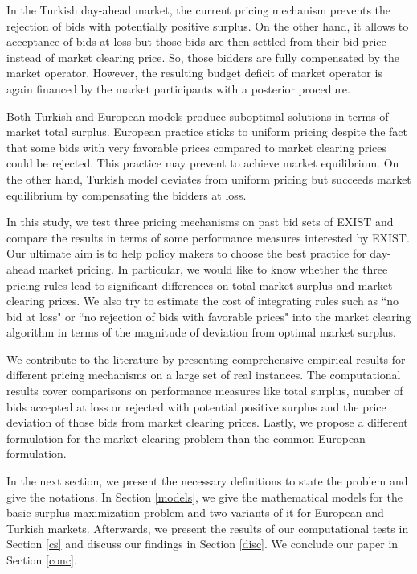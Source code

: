 \documentclass[conference]{IEEEtran}
\begin{document}
In the Turkish day-ahead market, the current pricing mechanism prevents the rejection of bids with potentially positive surplus. On the other hand, it allows to acceptance of bids at loss but those bids are then settled from their bid price instead of market clearing price. So, those bidders are fully compensated by the market operator. However, the resulting budget deficit of market operator is again financed by the market participants with a posterior procedure. 

Both Turkish and European models produce suboptimal solutions in terms of market total surplus. European practice sticks to uniform pricing despite the fact that some bids with very favorable prices compared to market clearing prices could be rejected. This practice may prevent to achieve market equilibrium. On the other hand, Turkish model deviates from uniform pricing but succeeds market equilibrium by compensating the bidders at loss.

In this study, we test three pricing mechanisms on past bid sets of EXIST and compare the results in terms of some performance measures interested by EXIST. Our ultimate aim is to help policy makers to choose the best practice for day-ahead market pricing. In particular, we would like to know whether the three pricing rules lead to significant differences on total market surplus and market clearing prices. We also try to estimate the cost of integrating rules such as ``no bid at loss" or ``no rejection of bids with favorable prices" into the market clearing algorithm in terms of the magnitude of deviation from optimal market surplus.

We contribute to the literature by presenting comprehensive empirical results for different pricing mechanisms on a large set of real instances. The computational results cover comparisons on performance measures like total surplus, number of bids accepted at loss or rejected with potential positive surplus and the price deviation of those bids from market clearing prices. Lastly, we propose a different formulation for the market clearing problem than the common European formulation.

In the next section, we present the necessary definitions to state the problem and give the notations. In Section \ref{models}, we give the mathematical models for the basic surplus maximization problem and two variants of it for European and Turkish markets. Afterwards, we present the results of our computational tests in Section \ref{cs} and discuss our findings in Section \ref{disc}. We conclude our paper in Section \ref{conc}.
\end{document}
